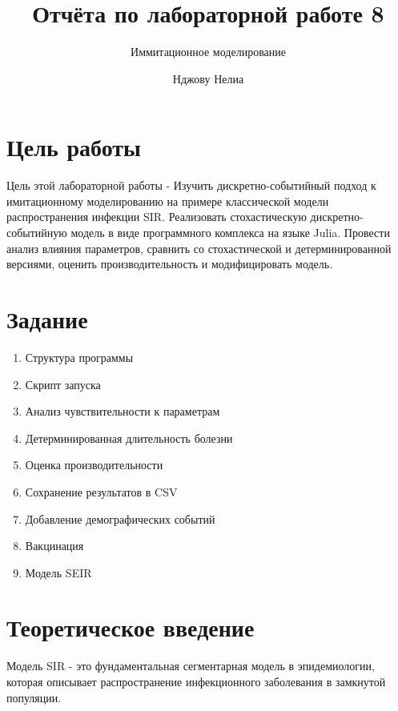 \documentclass[
  12pt,
  a4paper,
  DIV=11,
  numbers=noendperiod]{scrreprt}
\title{Отчёта по лабораторной работе 8}
\subtitle{Иммитационное моделирование}
\author{Нджову Нелиа}
\date{}
\renewcommand*\contentsname{Содержание}
\newcommand\contentsname{Содержание}
\begin{document}
\maketitle

\renewcommand*\contentsname{Содержание}
{
\setcounter{tocdepth}{1}
\tableofcontents
}
\listoffigures
\listoftables
{}
\chapter{Цель
работы}\label{ux446ux435ux43bux44c-ux440ux430ux431ux43eux442ux44b}

Цель этой лабораторной работы - Изучить дискретно-событийный подход к
имитационному моделированию на примере классической модели
распространения инфекции SIR. Реализовать стохастическую
дискретно-событийную модель в виде программного комплекса на языке
Julia. Провести анализ влияния параметров, сравнить со стохастической и
детерминированной версиями, оценить производительность и модифицировать
модель.

\chapter{Задание}\label{ux437ux430ux434ux430ux43dux438ux435}

\begin{enumerate}
\def\labelenumi{\arabic{enumi}.}
\item
  Структура программы
\item
  Скрипт запуска
\item
  Анализ чувствительности к параметрам
\item
  Детерминированная длительность болезни
\item
  Оценка производительности
\item
  Сохранение результатов в CSV
\item
  Добавление демографических событий
\item
  Вакцинация
\item
  Модель SEIR
\end{enumerate}

\chapter{Теоретическое
введение}\label{ux442ux435ux43eux440ux435ux442ux438ux447ux435ux441ux43aux43eux435-ux432ux432ux435ux434ux435ux43dux438ux435}

Модель SIR - это фундаментальная сегментарная модель в эпидемиологии,
которая описывает распространение инфекционного заболевания в замкнутой
популяции.
\end{document}
